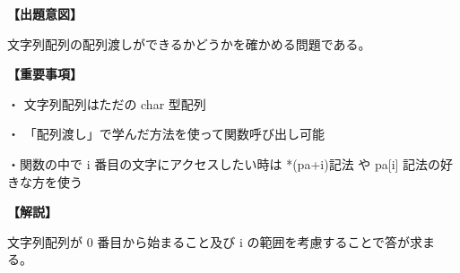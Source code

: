 \noindent \textbf{【出題意図】}

\noindent 文字列配列の配列渡しができるかどうかを確かめる問題である。

\vspace{1em}
\noindent \textbf{【重要事項】}

\medskip
\noindent ・ 文字列配列はただの char 型配列

\medskip
\noindent ・ 「配列渡し」で学んだ方法を使って関数呼び出し可能

\medskip
\noindent ・関数の中で i 番目の文字にアクセスしたい時は *(pa+i)記法 や pa[i] 記法の好きな方を使う


\vspace{1em}
\noindent \textbf{【解説】}

\noindent 文字列配列が 0 番目から始まること及び i の範囲を考慮することで答が求まる。
